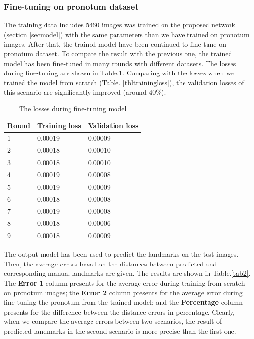 \documentclass[10pt]{article}
\begin{document}
\subsubsection{Fine-tuning on pronotum dataset}
The training data includes $5460$ images was trained on the proposed network (section \ref{secmodel}) with the same parameters than we have trained on pronotum images. After that, the trained model have been continued to fine-tune on pronotum dataset. To compare the result with the previous one, the trained model has been fine-tuned in many rounds with different datasets. The losses during fine-tuning are shown in Table.\ref{tblfinetuningloss}. Comparing with the losses when we trained the model from scratch (Table. \ref{tbltrainingloss}), the validation losses of this scenario are significantly improved (around $40\%$).
\begin{table}[h!]
	\centering
	\begin{tabular}{l l l}
	Round & Training loss & Validation loss \\ \hline
	1 & 0.00019 & 0.00009  \\ \hline
	2 & 0.00018 & 0.00010 \\ \hline
	3 & 0.00018 & 0.00010 \\ \hline
	4 & 0.00019 & 0.00008 \\ \hline
	5 & 0.00019 & 0.00009 \\ \hline
	6 & 0.00018 & 0.00008 \\ \hline
	7 & 0.00019 & 0.00008 \\ \hline
	8 & 0.00018 & 0.00006 \\ \hline
	9 & 0.00018 & 0.00009 \\ \hline
	\end{tabular}
	\caption{The losses during fine-tuning model}
	\label{tblfinetuningloss}
\end{table}

The output model has been used to predict the landmarks on the test images. Then, the average errors based on the distances between predicted and corresponding manual landmarks are given. The results are shown in Table.\ref{tab2}. The \textbf{Error 1} column presents for the average error during training from scratch on pronotum images; the \textbf{Error 2} column presents for the average error during fine-tuning the pronotum from the trained model; and the \textbf{Percentage} column presents for the difference between the distance errors in percentage. Clearly, when we compare the average errors between two scenarios, the result of predicted landmarks in the second scenario is more precise than the first one.
\end{document}
